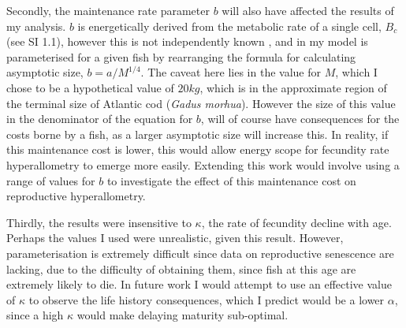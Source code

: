 \documentclass[a4paper]{article} %
\begin{document}
\begin{center}
\begin{minipage}{\linewidth}
Secondly, the maintenance rate parameter $b$ will also have affected the results of my analysis. $b$ is energetically derived from the metabolic rate of a single cell, $B_c$ (see SI 1.1), however this is not independently known \autocite{West2001}, and in my model is parameterised for a given fish by rearranging the formula for calculating asymptotic size, $b = a/M^{1/4}$. The caveat here lies in the value for $M$, which I chose to be a hypothetical value of $20kg$, which is in the approximate region of the terminal size of Atlantic cod (\textit{Gadus morhua}). However the size of this value in the denominator of the equation for $b$, will of course have consequences for the costs borne by a fish, as a larger asymptotic size will increase this. In reality, if this maintenance cost is lower, this would allow energy scope for fecundity rate hyperallometry to emerge more easily. Extending this work would involve using a range of values for $b$ to investigate the effect of this maintenance cost on reproductive hyperallometry.

Thirdly, the results were insensitive to $\kappa$, the rate of fecundity decline with age. Perhaps the values I used were unrealistic, given this result. However, parameterisation is extremely difficult since data on reproductive senescence are lacking, due to the difficulty of obtaining them, since fish at this age are extremely likely to die. In future work I would attempt to use an effective value of $\kappa$ to observe the life history consequences, which I predict would be a lower $\alpha$, since a high $\kappa$ would make delaying maturity sub-optimal.


\end{minipage}
\end{center}
\end{document}

